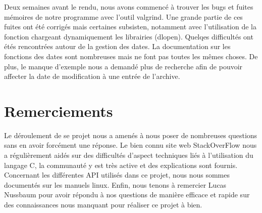 \documentclass[a4paper,11pt, oneside]{book}
\begin{document}
\noindent Deux semaines avant le rendu, nous avons commencé à trouver les bugs et fuites mémoires de notre programme avec l'outil valgrind. Une grande partie de ces fuites ont été corrigés mais certaines subsisten, notamment avec l'utilisation de la fonction chargeant dynamiquement les librairies (dlopen). Quelqes difficultés ont étés rencontrées autour de la gestion des dates. La documentation sur les fonctions des dates sont nombreuses mais ne font pas toutes les mêmes choses. De plus, le manque d'exemple nous a demandé plus de recherche afin de pouvoir affecter la date de modification à une entrée de l'archive.\\



\section*{Remerciements}

Le déroulement de se projet nous a amenés à nous poser de nombreuses questions sans en avoir forcément une réponse. Le bien connu site web StackOverFlow nous a régulièrement aidés sur des difficultés d'aspect techniques liés à l'utilisation du langage C, la communauté y est très active et des explications sont fournis. Concernant les différentes API utilisés dans ce projet, nous nous sommes documentés sur les manuels linux. Enfin, nous tenons à remercier Lucas Nussbaum pour avoir répondu à nos questions de manière efficace et rapide sur des connaissances nous manquant pour réaliser ce projet à bien.
\end{document}
